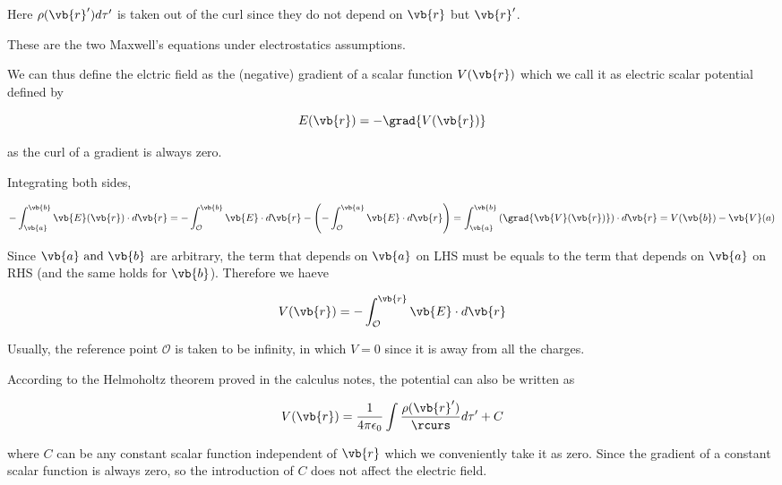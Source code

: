 \documentclass[english,a4paper,12pt]{report}
\begin{document}
Here \(\rho (\vb{r} ') d \tau '\) is taken out of the curl since they do not depend on \(\vb{r} \) but \(\vb{r} '\).    

These are the two Maxwell's equations under electrostatics assumptions.

We can thus define the elctric field as the (negative) gradient of a scalar function \(V(\vb{r}) \) which we call it as electric scalar potential defined by

\begin{equation}
    E(\vb{r} ) = -\grad{V(\vb{r} )}
\end{equation}

as the curl of a gradient is always zero. 

Integrating both sides,

\begin{equation}
    - \int_{\vb{a} }^{\vb{b} } \vb{E} (\vb{r} ) \cdot d\vb{r} = -\int_{\mathcal{O}}^{\vb{b} }\vb{E} \cdot d\vb{r} - \left( - \int_{\mathcal{O}}^{\vb{a} }\vb{E} \cdot d\vb{r}    \right) = \int_{\vb{a} }^{\vb{b} } \left( \grad{\vb{V} (\vb{r} )}  \right) \cdot d \vb{r}  = V(\vb{b} ) - \vb{V} (a)   
\end{equation}

Since \(\vb{a} \text { and } \vb{b} \) are arbitrary, the term that depends on \(\vb{a} \) on LHS must be equals to the term that depends on \(\vb{a} \) on RHS (and the same holds for \(\vb{b} \)). Therefore we haeve 

\begin{equation}
    V(\vb{r} ) = - \int_{\mathcal{O}}^{\vb{r} } \vb{E} \cdot d\vb{r}   
\end{equation}

Usually, the reference point \(\mathcal{O}\) is taken to be infinity, in which \(V = 0\) since it is away from all the charges.

According to the Helmoholtz theorem proved in the calculus notes, the potential can also be written as 

\begin{equation}
    V(\vb{r} ) = \frac{1}{4\pi \epsilon_0} \int \frac{\rho (\vb{r} ')}{\rcurs }d\tau ' + C \label{potential} 
\end{equation}

where \(C\) can be any constant scalar function independent of \(\vb{r} \)  which we conveniently take it as zero. Since the gradient of a constant scalar function is always zero, so the introduction of \(C\) does not affect the electric field. 
\end{document}
